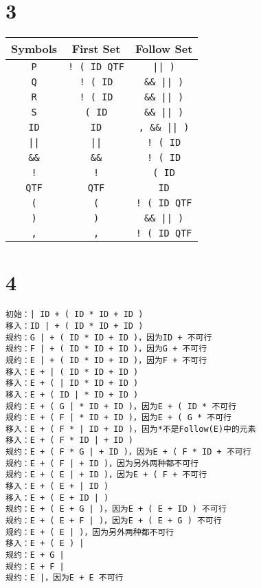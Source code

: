 \documentclass[12pt]{article}
\begin{document}
  \section*{3}
   
    \begin{table}[!htp]
      \centering
      \begin{tabular}{ccc}
      \hline
      Symbols        & First Set             & Follow Set            \\ \hline
      \texttt{P}     & \texttt{! ( ID QTF}   & \texttt{|| )}         \\
      \texttt{Q}     & \texttt{! ( ID}       & \texttt{\&\& || )}    \\
      \texttt{R}     & \texttt{! ( ID}       & \texttt{\&\& || )}    \\
      \texttt{S}     & \texttt{( ID}         & \texttt{\&\& || )}    \\
      \texttt{ID}    & \texttt{ID}           & \texttt{, \&\& || )}  \\
      \texttt{||}    & \texttt{||}           & \texttt{! ( ID}       \\
      \texttt{\&\&}  & \texttt{\&\&}         & \texttt{! ( ID}       \\
      \texttt{!}     & \texttt{!}            & \texttt{( ID}         \\
      \texttt{QTF}   & \texttt{QTF}          & \texttt{ID}           \\
      \texttt{(}     & \texttt{(}            & \texttt{! ( ID QTF}   \\
      \texttt{)}     & \texttt{)}            & \texttt{\&\& || )}    \\
      \texttt{,}     & \texttt{,}            & \texttt{! ( ID QTF}   \\ \hline
      \end{tabular}
    \end{table}

  \section*{4}

    \begin{lstlisting}
初始：| ID + ( ID * ID + ID )
移入：ID | + ( ID * ID + ID )
规约：G | + ( ID * ID + ID )，因为ID + 不可行
规约：F | + ( ID * ID + ID )，因为G + 不可行
规约：E | + ( ID * ID + ID )，因为F + 不可行
移入：E + | ( ID * ID + ID )
移入：E + ( | ID * ID + ID )
移入：E + ( ID | * ID + ID )
规约：E + ( G | * ID + ID )，因为E + ( ID * 不可行
规约：E + ( F | * ID + ID )，因为E + ( G * 不可行
移入：E + ( F * | ID + ID )，因为*不是Follow(E)中的元素
移入：E + ( F * ID | + ID )
规约：E + ( F * G | + ID )，因为E + ( F * ID + 不可行
规约：E + ( F | + ID )，因为另外两种都不可行
规约：E + ( E | + ID )，因为E + ( F + 不可行
移入：E + ( E + | ID )
移入：E + ( E + ID | )
规约：E + ( E + G | )，因为E + ( E + ID ) 不可行
规约：E + ( E + F | )，因为E + ( E + G ) 不可行
规约：E + ( E | )，因为另外两种都不可行
移入：E + ( E ) |
规约：E + G |
规约：E + F |
规约：E |，因为E + E 不可行

    \end{lstlisting}
\end{document}
